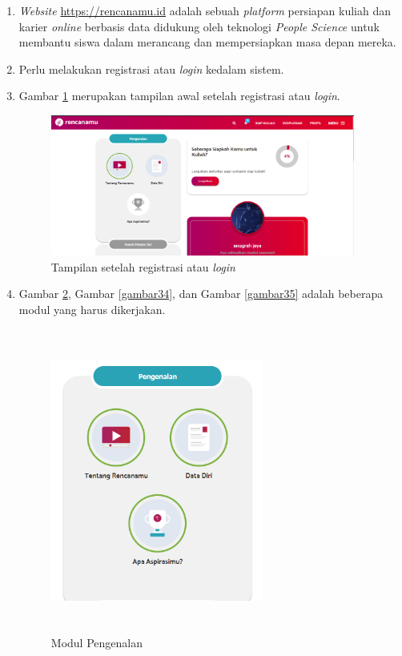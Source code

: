 \begin{enumerate}
    \item \textit{Website} \url{https://rencanamu.id} adalah sebuah \textit{platform} persiapan kuliah dan karier \textit{online} berbasis data didukung oleh teknologi \textit{People Science} untuk membantu siswa dalam merancang dan mempersiapkan masa depan mereka. 
    
    \item Perlu melakukan registrasi atau \textit{login} kedalam sistem.
    
    \item Gambar \ref{gambar32} merupakan tampilan awal setelah registrasi atau \textit{login}.
    
    \begin{figure}[H]
        \centering
        \includegraphics[width = 10cm, height = 6 cm]{Gambar/gambar32.PNG}
        \caption{Tampilan setelah registrasi atau \textit{login}}
        \label{gambar32}
    \end{figure}
    
    \item Gambar \ref{gambar33}, Gambar \ref{gambar34}, dan Gambar \ref{gambar35} adalah beberapa modul yang harus dikerjakan.
    
    \begin{figure}[H]
        \centering
        \includegraphics[width = 7cm, height = 10cm ]{Gambar/gambar33.PNG}
        \caption{Modul Pengenalan}
        \label{gambar33}
    \end{figure}
    

\end{enumerate}
